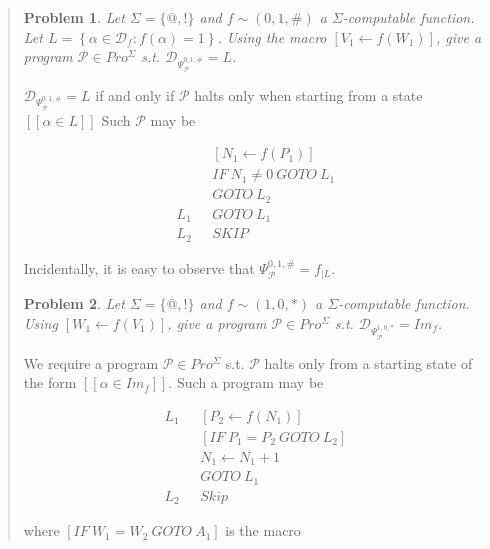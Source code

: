 \documentclass[a4paper, 12pt]{article}
\newtheorem{problem}{Problem}
\newtheorem{problem}{Problem}
\begin{document}
\small
\begin{quote}


\begin{problem}
    Let $\Sigma = \{@, !\}$ and $f \sim (0, 1, \#)$ a $\Sigma$-computable
    function. Let $L = \left\{ \alpha \in \mathcal{D}_f : f(\alpha) = 1 \right\}
    $. Using the macro $\left[ V_1 \leftarrow f(W_1) \right] $, give a program
    $\mathcal{P} \in Pro^{\Sigma}$ s.t. $\mathcal{D}_{\Psi_{\mathcal{P}}^{0, 1,
    \#}} = L$.
\end{problem}

$\mathcal{D}_{\Psi_{\mathcal{P}}^{0, 1, \#}} = L$ if and only if $\mathcal{P}$
halts only when starting from a state $[\![ \alpha \in L ]\!]$
Such $\mathcal{P}$ may be 

\begin{align*}
    &[N_1 \leftarrow f(P_1)]\\
    &IF ~ N_1 \neq 0 ~ GOTO  ~ L_1 \\ 
    &GOTO ~ L_2 \\ 
    L_1  ~ ~ ~ & GOTO ~ L_1 \\ 
    L_2 ~ ~ ~ & SKIP
\end{align*}

Incidentally, it is easy to observe that $\Psi_{\mathcal{P}}^{0, 1, \#} = f_{\mid L}$.

\begin{problem}
    Let $\Sigma = \{@, !\}$ and $f \sim (1, 0, *)$ a $\Sigma$-computable
    function. Using $\left[ W_1 \leftarrow f(V_1) \right] $, give a program
    $\mathcal{P} \in Pro^{\Sigma}$ s.t. $\mathcal{D}_{\Psi_{\mathcal{P}}^{1, 0,
    *}} = Im_{f}$.
\end{problem}

We require a program $\mathcal{P} \in Pro^{\Sigma}$ s.t. $\mathcal{P}$ halts
only from a starting state of the form $[\![ \alpha \in Im_f ]\!]$. Such a program
may be 

\begin{align*}
    L_1~ ~ ~&\left[P_2 \leftarrow f(N_1) \right]  \\ 
    &\left[ IF ~ P_1 = P_2 ~ GOTO ~ L_2 \right]  \\ 
    &N_1 \leftarrow N_1 + 1 \\ 
    &GOTO ~ L_1 \\ 
    L_2 ~ ~ ~ & Skip
\end{align*}

where $\left[ IF ~ W_1 = W_2 ~ GOTO ~ A_1 \right] $ is the macro


\end{quote}
\end{document}
